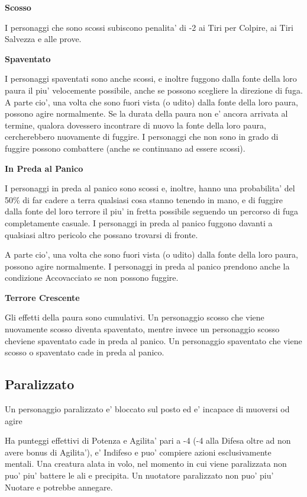 \documentclass[a4paper,11pt,twoside,openany]{book}
\begin{document}
{		\textbf{Scosso}
		
		I personaggi che sono scossi subiscono penalita' di -2 ai Tiri per Colpire, ai Tiri Salvezza e alle prove.
		
		\textbf{Spaventato}
		
		I personaggi spaventati sono anche scossi, e inoltre fuggono dalla fonte della loro paura il piu' velocemente possibile, anche se possono scegliere la direzione di fuga. A parte cio', una volta che sono fuori vista (o udito) dalla fonte della loro paura, possono agire normalmente. Se la durata della paura non e' ancora arrivata al termine, qualora dovessero incontrare di nuovo la fonte della loro paura, cercherebbero nuovamente di fuggire. I personaggi che non sono in grado di fuggire possono combattere (anche se continuano ad essere scossi).
		
		\textbf{In Preda al Panico}
		
		I personaggi in preda al panico sono scossi e, inoltre, hanno una probabilita' del 50\% di far cadere a terra qualsiasi cosa stanno tenendo in mano, e di fuggire dalla fonte del loro terrore il piu' in fretta possibile seguendo un percorso di fuga completamente casuale. I personaggi in preda al panico fuggono davanti a qualsiasi altro pericolo che possano trovarsi di fronte. 
		
		A parte cio', una volta che sono fuori vista (o udito) dalla fonte della loro paura, possono agire normalmente. I personaggi in preda al panico prendono anche la condizione Accovacciato se non possono fuggire.
		
		\textbf{Terrore Crescente}
		
		Gli effetti della paura sono cumulativi. Un personaggio scosso che viene nuovamente scosso diventa spaventato, mentre invece un personaggio scosso cheviene spaventato cade in preda al panico. Un personaggio spaventato che viene scosso o spaventato cade in preda al panico.
		
		
		\subsection{Paralizzato}
		
		\label{paralizzato}
		
		Un personaggio paralizzato e' bloccato sul posto ed e' incapace di muoversi od agire
		
		Ha punteggi effettivi di Potenza e Agilita' pari a -4 (-4 alla Difesa oltre ad non avere bonus di Agilita'), e' Indifeso e puo' compiere azioni esclusivamente mentali. Una creatura alata in volo, nel momento in cui viene paralizzata non puo' piu' battere le ali e precipita. Un nuotatore paralizzato non puo' piu' Nuotare e potrebbe annegare.
		
}
\end{document}
